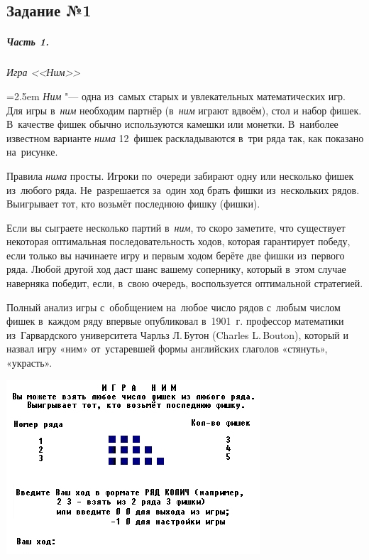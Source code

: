 \documentclass[a4paper,11pt,landscape,notitlepage,oneside,openany,final]{memoir}
\begin{document}
\subsection{Задание №1}
\subparagraph{Часть 1.}
\textit{Игра <<Ним>>}

\bigskip\noindent
\begin{minipage}[T]{0.58\columnwidth}\parindent=2.5em
    \emph{Ним} "--- одна из~самых старых и увлекательных математических игр. Для игры в~\emph{ним} необходим партнёр (в~\emph{ним} играют вдвоём), стол и набор фишек. В~качестве фишек обычно используются камешки или монетки. В~наиболее известном варианте \emph{нима} 12~фишек раскладываются в~три ряда так, как показано на~рисунке.

    Правила \emph{нима} просты. Игроки по~очереди забирают одну или несколько фишек из~любого ряда. Не~разрешается за~один ход брать фишки из~нескольких рядов. Выигрывает тот, кто возьмёт последнюю фишку (фишки).

    \smallskip

    Если вы сыграете несколько партий в~\emph{ним}, то скоро заметите, что существует некоторая оптимальная последовательность ходов, которая гарантирует победу, если только вы начинаете игру и первым ходом берёте две фишки из~первого ряда. Любой другой ход даст шанс вашему сопернику, который в~этом случае наверняка победит, если, в~свою очередь, воспользуется оптимальной стратегией.

    Полный анализ игры с~обобщением на~любое число рядов с~любым числом фишек в~каждом ряду впервые опубликовал в~1901~г. профессор математики из~Гарвардского университета Чарльз Л.\,Бутон (\textenglish{Charles L.\,Bouton}), который и назвал игру «ним» от~устаревшей формы английских глаголов «стянуть», «украсть».
\end{minipage}\hfill\begin{minipage}[T]{0.4\columnwidth}
    \includegraphics[width=\columnwidth]{images/nim_start_game.jpg}
\end{minipage}
\end{document}
